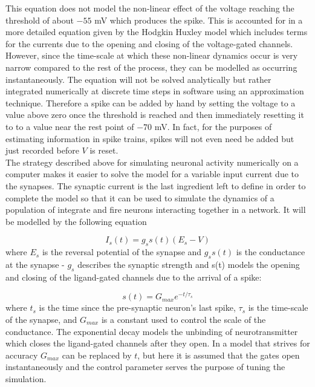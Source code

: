 \documentclass[12pt]{extarticle}
\begin{document}
\noindent
This equation does not model the non-linear effect of the voltage reaching the threshold of about $-55$ mV which produces the spike. This is accounted for in a more detailed equation given by the Hodgkin Huxley model \cite{Hodgkin-Huxley} which includes terms for the currents due to the opening and closing of the voltage-gated channels. However, since the time-scale at which these non-linear dynamics occur is very narrow compared to the rest of the process, they can be modelled as occurring instantaneously. The equation will not be solved analytically but rather integrated numerically at discrete time steps in software using an approximation technique. Therefore a spike can be added by hand by setting the voltage to a value above zero once the threshold is reached and then immediately resetting it to to a value near the rest point of $-70$ mV. In fact, for the purposes of estimating information in spike trains, spikes will not even need be added but just recorded before $V$ is reset.\\

\noindent
The strategy described above for simulating neuronal activity numerically on a computer makes it easier to solve the model for a variable input current due to the synapses. The synaptic current is the last ingredient left to define in order to complete the model so that it can be used to simulate the dynamics of a population of integrate and fire neurons interacting together in a network. It will be modelled by the following equation

\begin{equation}
I_s(t) = g_ss(t)(E_s - V)
\end{equation}
where $E_s$ is the reversal potential of the synapse and $g_ss(t)$ is the conductance at the synapse - $g_s$ describes the synaptic strength and s(t) models the opening and closing of the ligand-gated channels due to the arrival of a spike: 

\begin{equation}
s(t) = G_{max}e^{-t/\tau_s}
\end{equation}
where $t_s$ is the time since the pre-synaptic neuron's last spike, $\tau_s$ is the time-scale of the synapse, and $G_{max}$ is a constant used to control the scale of the conductance. The exponential decay models the unbinding of neurotransmitter which closes the ligand-gated channels after they open. In a model that strives for accuracy $G_{max}$ can be replaced by $t$, but here it is assumed that the gates open instantaneously and the control parameter serves the purpose of tuning the simulation.\\
\end{document}
